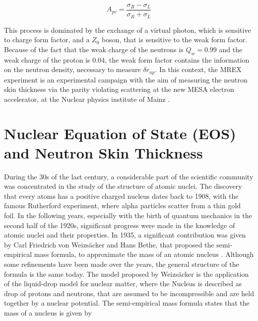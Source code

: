 \begin{equation}
A_{pv} = \dfrac{\sigma_{R} - \sigma_{L}}{\sigma_{R} + \sigma_{L}}
\end{equation}

This process is dominated by the exchange of a virtual photon, which is sensitive to charge form factor, and a $Z_{0}$ boson, that is sensitive to the weak form factor. Because of the fact that the weak charge of the neutrons is $Q_{w} = 0.99$ and the weak charge of the proton is $0.04$, the weak form factor contains the information on the neutron density, necessary to measure $\delta r_{np}$. In this context, the MREX experiment is an experimental campaign with the aim of measuring the neutron skin thickness via the parity violating scattering at the new MESA electron accelerator, at the Nuclear physics institute of Mainz .

\section{Nuclear Equation of State (EOS) and Neutron Skin Thickness}


During the 30s of the last century, a considerable part of the scientific community was concentrated in the study of the structure of atomic nuclei. The discovery that every atoms has a positive charged nucleus dates back to 1908, with the famous Rutherford experiment, where alpha particles scatter from a thin gold foil. In the following years, especially with the birth of quantum mechanics in the second half of the 1920s, significant progress were made in the knowledge of atomic nuclei and their properties. In 1935, a significant contribution was given by Carl Friedrich von Weizsäcker and Hans Bethe, that proposed the semi-empirical mass formula, to approximate the mass of an atomic nucleus \cite{Bethe:1936zz}. Although some refinements have been made over the years, the general structure of the formula is the same today. 
The model proposed by Weizsäcker is the application of the liquid-drop model for nuclear matter, where the Nucleus is described as drop of protons and neutrons, that are assumed to be incompressible and are held together by a nuclear potential. The semi-empirical mass formula states that the mass of a nucleus is given by 

